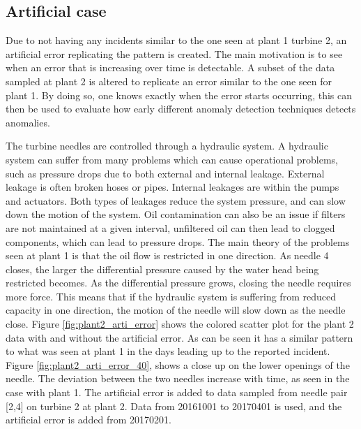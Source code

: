    
        
        
        
        
         
         
    \subsection{Artificial case}\label{subsec:arti}
        Due to not having any incidents similar to the one seen at plant 1 turbine 2, an artificial error replicating the pattern is created. The main motivation is to see when an error that is increasing over time is detectable. A subset of the data sampled at plant 2 is altered to replicate an error similar to the one seen for plant 1. By doing so, one knows exactly when the error starts occurring, this can then be used to evaluate how early different anomaly detection techniques detects anomalies.
    
        The turbine needles are controlled through a hydraulic system. A hydraulic system can suffer from many problems which can cause operational problems, such as pressure drops due to both external and internal leakage. External leakage is often broken hoses or pipes. Internal leakages are within the pumps and actuators. Both types of leakages reduce the system pressure, and can slow down the motion of the system. Oil contamination can also be an issue if filters are not maintained at a given interval, unfiltered oil can then lead to clogged components, which can lead to pressure drops. The main theory of the problems seen at plant 1 is that the oil flow is restricted in one direction. As needle 4 closes, the larger the differential pressure caused by the water head being restricted becomes. As the differential pressure grows, closing the needle requires more force. This means that if the hydraulic system is suffering from reduced capacity in one direction, the motion of the needle will slow down as the needle close. Figure \ref{fig:plant2_arti_error} shows the colored scatter plot for the plant 2 data with and without the artificial error. As can be seen it has a similar pattern to what was seen at plant 1 in the days leading up to the reported incident. Figure \ref{fig:plant2_arti_error_40}, shows a close up on the lower openings of the needle. The deviation between the two needles increase with time, as seen in the case with plant 1. The artificial error is added to data sampled from needle pair [2,4] on turbine 2 at plant 2. Data from 20161001 to 20170401 is used, and the artificial error is added from 20170201.     
        

